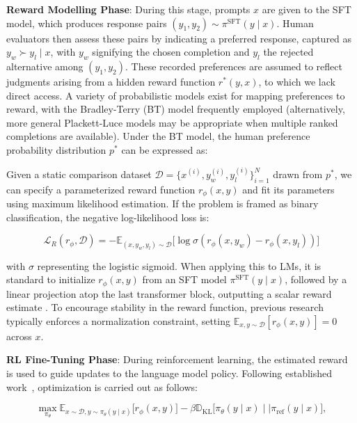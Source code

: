 \textbf{Reward Modelling Phase}: During this stage, prompts $x$ are given to the SFT model, which produces response pairs $(y_1, y_2)\sim \pi^\text{SFT}(y \mid x)$. Human evaluators then assess these pairs by indicating a preferred response, captured as $y_w\succ y_l \mid x$, with $y_w$ signifying the chosen completion and $y_l$ the rejected alternative among $(y_1, y_2)$. These recorded preferences are assumed to reflect judgments arising from a hidden reward function $r^*(y, x)$, to which we lack direct access. A variety of probabilistic models exist for mapping preferences to reward, with the Bradley-Terry (BT) model \cite{bradley1952rankanalysis} frequently employed (alternatively, more general Plackett-Luce models \citep{plackett1975analysis, luce2012individual} may be appropriate when multiple ranked completions are available). Under the BT model, the human preference probability distribution $p^*$ can be expressed as:

Given a static comparison dataset $\mathcal{D} = \bigl\{x^{(i)}, y_w^{(i)}, y_l^{(i)}\bigr\}_{i=1}^N$ drawn from $p^*$, we can specify a parameterized reward function $r_{\phi}(x, y)$ and fit its parameters using maximum likelihood estimation. If the problem is framed as binary classification, the negative log-likelihood loss is:

\begin{equation}\label{eq:reward_model}
    \mathcal{L}_R(r_{\phi}, \mathcal{D}) = -\mathbb{E}_{(x, y_w, y_l)\sim \mathcal{D}}\bigl[\log \sigma(r_{\phi}(x, y_w)- r_{\phi}(x, y_l))\bigr]
\end{equation}

with $\sigma$ representing the logistic sigmoid. When applying this to LMs, it is standard to initialize $r_{\phi}(x, y)$ from an SFT model $\pi^\text{SFT}(y \mid x)$, followed by a linear projection atop the last transformer block, outputting a scalar reward estimate \cite{ziegler2020finetuning}. To encourage stability in the reward function, previous research typically enforces a normalization constraint, setting $\mathbb{E}_{x,y\sim \mathcal{D}}\left[r_\phi(x, y)\right] = 0$ across $x$.

\textbf{RL Fine-Tuning Phase}: During reinforcement learning, the estimated reward is used to guide updates to the language model policy. Following established work~\citep{jaques2017sequence, jaques2020human}, optimization is carried out as follows:

\begin{equation}\label{eq:RL}
\max_{\pi_{\theta}}  \mathbb{E}_{x\sim \mathcal{D}, y\sim \pi_{\theta}(y \mid x)}\bigl[r_{\phi}(x, y)\bigr] - \beta\mathbb{D}_{\textrm{KL}}\bigl[\pi_{\theta}(y\mid x)\mid \mid \pi_\text{ref}(y\mid x)\bigr],
\end{equation}

